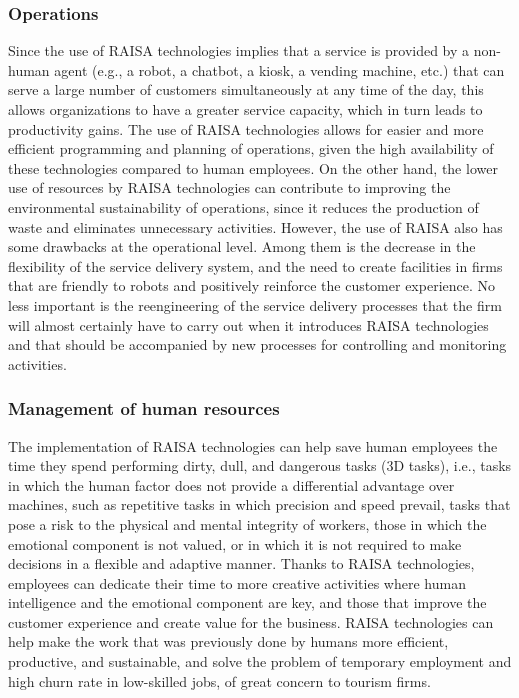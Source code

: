 \documentclass[
  letterpaper,
  DIV=11,
  numbers=noendperiod]{scrreprt}
\begin{document}
\hypertarget{operations}{%
\subsubsection{Operations}\label{operations}}

Since the use of RAISA technologies implies that a service is provided
by a non-human agent (e.g., a robot, a chatbot, a kiosk, a vending
machine, etc.) that can serve a large number of customers simultaneously
at any time of the day, this allows organizations to have a greater
service capacity, which in turn leads to productivity gains. The use of
RAISA technologies allows for easier and more efficient programming and
planning of operations, given the high availability of these
technologies compared to human employees. On the other hand, the lower
use of resources by RAISA technologies can contribute to improving the
environmental sustainability of operations, since it reduces the
production of waste and eliminates unnecessary activities. However, the
use of RAISA also has some drawbacks at the operational level. Among
them is the decrease in the flexibility of the service delivery system,
and the need to create facilities in firms that are friendly to robots
and positively reinforce the customer experience. No less important is
the reengineering of the service delivery processes that the firm will
almost certainly have to carry out when it introduces RAISA technologies
and that should be accompanied by new processes for controlling and
monitoring activities.

\hypertarget{management-of-human-resources}{%
\subsubsection{Management of human
resources}\label{management-of-human-resources}}

The implementation of RAISA technologies can help save human employees
the time they spend performing dirty, dull, and dangerous tasks (3D
tasks), i.e., tasks in which the human factor does not provide a
differential advantage over machines, such as repetitive tasks in which
precision and speed prevail, tasks that pose a risk to the physical and
mental integrity of workers, those in which the emotional component is
not valued, or in which it is not required to make decisions in a
flexible and adaptive manner. Thanks to RAISA technologies, employees
can dedicate their time to more creative activities where human
intelligence and the emotional component are key, and those that improve
the customer experience and create value for the business. RAISA
technologies can help make the work that was previously done by humans
more efficient, productive, and sustainable, and solve the problem of
temporary employment and high churn rate in low-skilled jobs, of great
concern to tourism firms.
\end{document}
